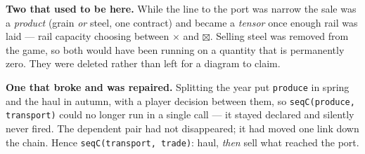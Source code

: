 \documentclass[11pt,a4paper]{article}
\begin{document}
\vspace{1.5mm}
\noindent\begin{minipage}[t]{0.485\textwidth}
\scriptsize\color{grey}
\textbf{Two that used to be here.} While the line to the port was narrow the
sale was a \emph{product} (grain \emph{or} steel, one contract) and became a
\emph{tensor} once enough rail was laid --- rail capacity choosing between
$\times$ and $\boxtimes$. Selling steel was removed from the game, so both
would have been running on a quantity that is permanently zero. They were
deleted rather than left for a diagram to claim.
\end{minipage}\hfill
\begin{minipage}[t]{0.485\textwidth}
\scriptsize\color{grey}
\textbf{One that broke and was repaired.} Splitting the year put
\texttt{produce} in spring and the haul in autumn, with a player decision
between them, so \texttt{seqC(produce, transport)} could no longer run in a
single call --- it stayed declared and silently never fired. The dependent pair
had not disappeared; it had moved one link down the chain. Hence
\texttt{seqC(transport, trade)}: haul, \emph{then} sell what reached the port.
\end{minipage}
\end{document}
